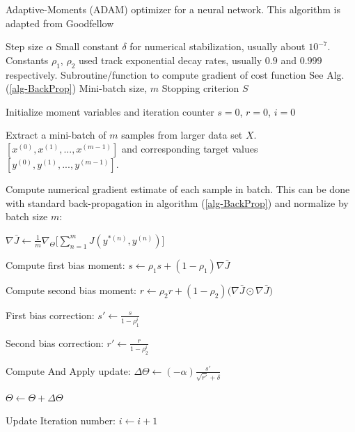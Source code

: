 \documentclass[12pt,letterpaper]{article}
\begin{document}
\begin{algorithm}[H]
\caption{Adaptive-Moments (ADAM) optimizer for a neural network. This algorithm is adapted from Goodfellow \cite{Goodfellow}}
\label{alg-ADAM}

\begin{algorithmic}
\REQUIRE Step size $\alpha$
\REQUIRE Small constant $\delta$ for numerical stabilization, usually about $10^{-7}$.
\REQUIRE Constants $\rho_1$, $\rho_2$ used track exponential decay rates, usually $0.9$ and $0.999$ respectively.
\REQUIRE Subroutine/function to compute gradient of cost function See Alg. (\ref{alg-BackProp})
\REQUIRE Mini-batch size, $m$
\REQUIRE Stopping criterion $S$

Initialize moment variables and iteration counter $s = 0$, $r = 0$, $i = 0$ \\

	\item Extract a mini-batch of $m$ samples from larger data set $X$. $[x^{(0)},x^{(1)},...,x^{(m-1)}]$ and corresponding target values 
	$[y^{(0)},y^{(1)},...,y^{(m-1)}]$.
	\item Compute numerical gradient estimate of each sample in batch. This can be done with standard back-propagation in algorithm (\ref{alg-BackProp}) and 			 	normalize by batch size $m$:
	\item $\nabla \bar{J} \leftarrow \frac{1}{m} \nabla_{\Theta} \Big[\sum_{n=1}^{m} J(y^{*(n)},y^{(n)}) \Big]$
	
	\item Compute first bias moment: $s \leftarrow \rho_1 s + (1 - \rho_1) \nabla \bar{J}$
	\item Compute second bias moment: $r \leftarrow \rho_2 r + (1 - \rho_2) \big( \nabla \bar{J} \odot \nabla \bar{J} \big)$
	\item First bias correction: $s' \leftarrow \frac{s}{1 - \rho_1^i}$
	\item Second bias correction: $r' \leftarrow \frac{r}{1 - \rho_2^i}$
	
	\item Compute And Apply update:	$\Delta \Theta \leftarrow (-\alpha) \frac{s'}{\sqrt{r'} + \delta}$
	\item $\Theta \leftarrow \Theta + \Delta \Theta$	
	\item Update Iteration number: $i \leftarrow i + 1$
\ENDWHILE

\end{algorithmic}
\end{algorithm}
\end{document}
